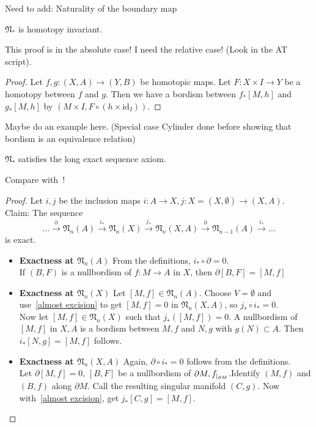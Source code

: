\documentclass[a4paper,11pt]{article}
\begin{document}
Need to add: Naturality of the boundary map

\begin{lemma}\cite[II, Satz 3.1]{brocker}\label{htpy inv}
    \(\mathfrak{N}_\ast\) is homotopy invariant.
\end{lemma}

This proof is in the absolute case! I need the relative case! (Look in the AT script).
\begin{proof}\cite{brocker}
    Let \(f,g:(X,A)\to(Y,B)\) be homotopic maps. Let \(F:X\times I\to Y\) be a homotopy between \(f\) and \(g\). Then we have a bordism between \(f_\ast[M,h]\) and \(g_\ast[M,h]\) by \((M\times I, F\circ (h\times\mathrm{id}_I))\).
\end{proof}

Maybe do an example here. (Special case Cylinder done before showing that bordism is an equivalence relation)

\begin{lemma}\label{les}
    \(\mathfrak{N}_\ast\) satisfies the long exact sequence axiom.
\end{lemma}

Compare with\ \cite{zhang}!

\begin{proof}\cite{dieck}
    Let \(i,j\) be the inclusion maps \(i:A\to X, j:X=(X,\emptyset)\to(X,A)\).\\
    Claim: The sequence
    \[\dots\xrightarrow{\partial}\mathfrak{N}_n(A)\xrightarrow{i_\ast}\mathfrak{N}_n(X)\xrightarrow{j_\ast}\mathfrak{N}_n(X,A)\xrightarrow{\partial}\mathfrak{N}_{n-1}(A)\xrightarrow{i_\ast}\dots\]
    is exact.
    \begin{itemize}
        \item \textbf{Exactness at \(\mathfrak{N}_n(A)\)} From the definitions, \(i_\ast\circ \partial=0\).\\
        If \((B,F)\) is a nullbordism of \(f:M\to A\) in \(X\), then \(\partial[B,F]=[M,f]\)
        \item \textbf{Exactness at \(\mathfrak{N}_n(X)\)} Let \([M,f]\in\mathfrak{N}_n(A)\). Choose \(V=\emptyset\) and use\ \ref{almost excision} to get \([M,f]=0\) in \(\mathfrak{N}_n(X,A)\), so \(j_\ast\circ i_\ast=0\).\\
        Now let \([M,f]\in\mathfrak{N}_n(X)\) such that \(j_\ast([M,f])=0\). A nullbordism of \([M,f]\) in \(X,A\) is a bordism between \(M,f\) and \(N,g\) with \(g(N)\subset A\). Then \(i_\ast[N,g]=[M,f]\) follows.
        \item \textbf{Exactness at \(\mathfrak{N}_n(X,A)\)} Again, \(\partial \circ i_\ast=0\) follows from the definitions.\\
        Let \(\partial[M,f]=0\), \([B,F]\) be a nullbordism of \(\partial M, f_{|_{\partial M}}\).Identify \((M,f)\) and \((B,f)\) along \(\partial M\). Call the resulting singular manifold \((C,g)\). Now with\ \ref{almost excision}, get \(j_\ast[C,g]=[M,f]\).
    \end{itemize}
\end{proof}
\end{document}
